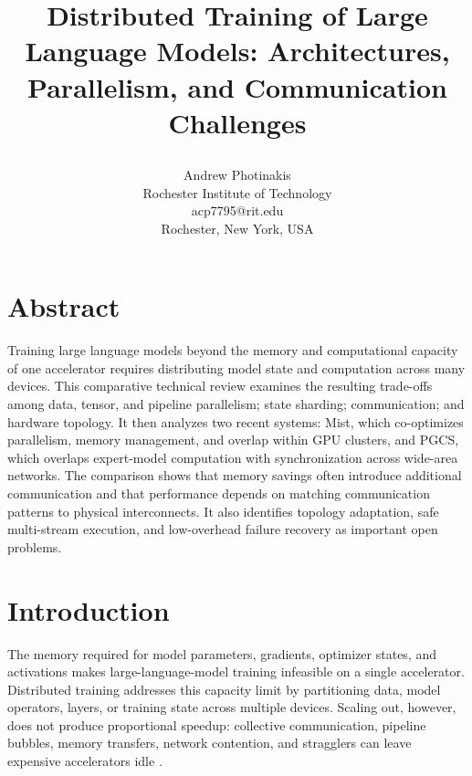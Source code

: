 \documentclass[11pt,journal,final, onecolumn]{IEEEtran}
\begin{document}
\title{\LARGE\bfseries Distributed Training of Large Language Models: Architectures, Parallelism, and Communication Challenges\\[0.10em]\par}

\author{
    \begin{minipage}[t]{0.45\textwidth}
        \centering
        Andrew Photinakis \\
        Rochester Institute of Technology \\
        acp7795@rit.edu \\
        Rochester, New York, USA
    \end{minipage}
}

\maketitle
\vspace{-2\baselineskip}

\section{Abstract}
Training large language models beyond the memory and computational capacity of one accelerator requires distributing model state and computation across many devices. This comparative technical review examines the resulting trade-offs among data, tensor, and pipeline parallelism; state sharding; communication; and hardware topology. It then analyzes two recent systems: Mist, which co-optimizes parallelism, memory management, and overlap within GPU clusters, and PGCS, which overlaps expert-model computation with synchronization across wide-area networks. The comparison shows that memory savings often introduce additional communication and that performance depends on matching communication patterns to physical interconnects. It also identifies topology adaptation, safe multi-stream execution, and low-overhead failure recovery as important open problems.

\section{Introduction}
The memory required for model parameters, gradients, optimizer states, and activations makes large-language-model training infeasible on a single accelerator. Distributed training addresses this capacity limit by partitioning data, model operators, layers, or training state across multiple devices. Scaling out, however, does not produce proportional speedup: collective communication, pipeline bubbles, memory transfers, network contention, and stragglers can leave expensive accelerators idle \cite{duan2024efficienttraininglargelanguage,ZENG2025100174}.
\end{document}
